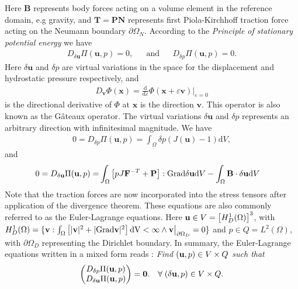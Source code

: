 Here $\mathbf{B}$ represents body forces acting on a volume element in
the reference domain, e.g  gravity, and $\mathbf{T} = \mathbf{P}
\mathbf{N}$ represents first Piola-Kirchhoff traction force acting on
the Neumann boundary $\partial \Omega_N$. According to the
\emph{Principle of stationary potential energy} we have  
\begin{align}
  D_{\delta \mathbf{u}} \Pi(\mathbf{u}, p) = 0,  && \text{and} && D_{\delta p} \Pi(\mathbf{u}, p) = 0.
  \label{eq:minimum_potential_energy}
\end{align}
Here $\delta \mathbf{u}$ and $\delta p$ are virtual variations in the
space for the displacement and hydrostatic pressure respectively, and
\begin{align}
  D_{\mathbf{v}} \Phi(\mathbf{x}) = \frac{\mathrm{d}}{\mathrm{d}\varepsilon} \Phi(\mathbf{x} + \varepsilon \mathbf{v})\big|_{\varepsilon = 0}
\end{align}
is the directional derivative of $\Phi$ at $\mathbf{x}$ is the
direction $\mathbf{v}$. This operator is also known as the G\^ateaux
operator. The virtual variations $\delta \mathbf{u}$ and $\delta p$
represents an arbitrary direction with infinitesimal magnitude. We have
\begin{align}
  0 = D_{\delta p} \Pi(\mathbf{u}, p)
  = \int_{\Omega}  \delta p(J(\mathbf{u}) - 1) \mathrm{d}V,
\end{align}
and
\begin{align*}
  \begin{split}
  0 = D_{\delta \mathbf{u}} \Pi(\mathbf{u}, p) 
  =&  \int_{\Omega}  \left[ pJ \mathbf{F}^{-T} + \mathbf{P} \right] : \mathrm{Grad} \delta \mathbf{u} \mathrm{d}V - \int_{\Omega} \mathbf{B} \cdot \delta \mathbf{u} \mathrm{d} V
  \end{split}
\end{align*}
Note that the traction forces are now incorporated into the stress
tensors after application of the divergence theorem. These equations
are also commonly referred to as the Euler-Lagrange equations. Here $\mathbf{u}  \in V = 
\left[H_D^1(\Omega)\right]^3$, with $H_D^1(\Omega) = \{ \mathbf{v}:
\int_{\Omega} \left[ |\mathbf{v}|^2 +  |\mathrm{Grad} \mathbf{v}|^2
\right]\mathrm{dV} < \infty \wedge \mathbf{v}\big|_{\partial \Omega_D}
= 0\}$ and $p \in Q = L^2(\Omega)$, with $\partial \Omega_D$
representing the Dirichlet boundary. In summary, the Euler-Lagrange
equations written in a mixed form reads : \emph{Find $(\mathbf{u}, p)\in V
  \times Q$ such that} 
\begin{align}
  \begin{pmatrix}
    D_{\delta p} \Pi(\mathbf{u}, p)\\
    D_{\delta \mathbf{u}} \Pi(\mathbf{u}, p) 
  \end{pmatrix}
  = \mathbf{0}.  && \forall \; (\delta \mathbf{u}, p) \in V \times Q.
 \label{eq:intro_variational_form}
\end{align}


